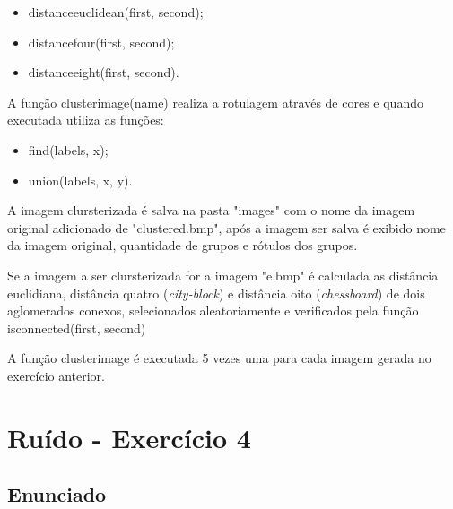 \documentclass[10pt,a4paper]{article}
\begin{document}
\begin{itemize}
    \item {\ttfamily distance\textunderscore euclidean(first, second)};
    \item {\ttfamily distance\textunderscore four(first, second)};
    \item {\ttfamily distance\textunderscore eight(first, second)}.
\end{itemize}

\begin{flushleft}
A função {\ttfamily cluster\textunderscore image(name)} realiza a rotulagem através de cores e quando executada utiliza as funções:
\end{flushleft}

\begin{itemize}
   \item {\ttfamily find(labels, x)};
   \item {\ttfamily union(labels, x, y)}.
 \end{itemize}

\begin{flushleft}
A imagem clursterizada é salva na pasta "images" com o nome da imagem original adicionado de "\textunderscore clustered.bmp", após a imagem ser salva é exibido nome da imagem original, quantidade de grupos e rótulos dos grupos. 
\end{flushleft}

\begin{flushleft}
Se a imagem a ser clursterizada for a imagem "e.bmp" é calculada as distância euclidiana, distância quatro (\textit{city-block}) e distância oito (\textit{chessboard}) de dois aglomerados conexos, selecionados aleatoriamente e verificados pela função {\ttfamily is\textunderscore connected(first, second)}
\end{flushleft}

\begin{flushleft}
A função {\ttfamily cluster\textunderscore image} é executada 5 vezes uma para cada imagem gerada no exercício anterior.
\end{flushleft}



\pagebreak

\section{Ruído - Exercício 4}

\subsection{Enunciado}
\end{document}
